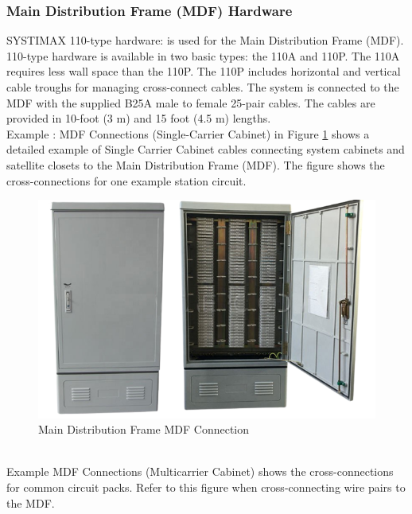 \documentclass[12pt,fleqn]{book} %
\begin{document}
\subsubsection{Main Distribution Frame (MDF) Hardware}
SYSTIMAX 110-type hardware: is used for the Main Distribution Frame (MDF).
\\ 110-type hardware is available in two basic types: the 110A and 110P. The 110A requires less wall space than the 110P. The 110P includes horizontal and vertical cable troughs for managing cross-connect cables. The system is connected to the MDF with the supplied B25A male to female 25-pair cables. The cables are provided in 10-foot (3 m) and 15 foot (4.5 m) lengths.
\\ Example : MDF Connections (Single-Carrier Cabinet) in Figure \ref{fig:hamdy 52} shows a detailed example of Single Carrier Cabinet cables connecting system cabinets and satellite closets to the Main Distribution Frame (MDF). The figure shows the cross-connections for one example station circuit.
\begin{figure}[!h]
    \centering
    \includegraphics[width=0.5\linewidth]{hamdy 52.png}
    \caption{Main Distribution Frame MDF Connection}
    \label{fig:hamdy 52}
    \end{figure}
\\ Example MDF Connections (Multicarrier Cabinet) shows the cross-connections for common circuit packs. Refer to this figure when cross-connecting wire pairs to the MDF.
\end{document}
